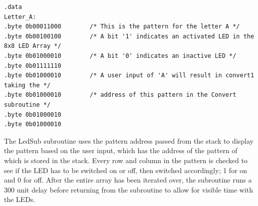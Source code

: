 \documentclass[12pt]{article}
\begin{document}
\begin{verbatim}
.data
Letter_A:
.byte 0b00011000        /* This is the pattern for the letter A */
.byte 0b00100100        /* A bit '1' indicates an activated LED in the 8x8 LED Array */
.byte 0b01000010        /* A bit '0' indicates an inactive LED */
.byte 0b01111110
.byte 0b01000010        /* A user input of 'A' will result in convert1 taking the */
.byte 0b01000010        /* address of this pattern in the Convert subroutine */
.byte 0b01000010
.byte 0b01000010        
\end{verbatim}

The LedSub subroutine uses the pattern address passed from the stack to display the pattern based on the user input, which has the address of the pattern of which is stored in the stack. Every row and column in the pattern is checked to see if the LED has to be switched on or off, then switched accordingly; 1 for on and 0 for off. After the entire array has been iterated over, the subroutine runs a 300 unit delay before returning from the subroutine to allow for visible time with the LEDs.
\end{document}
